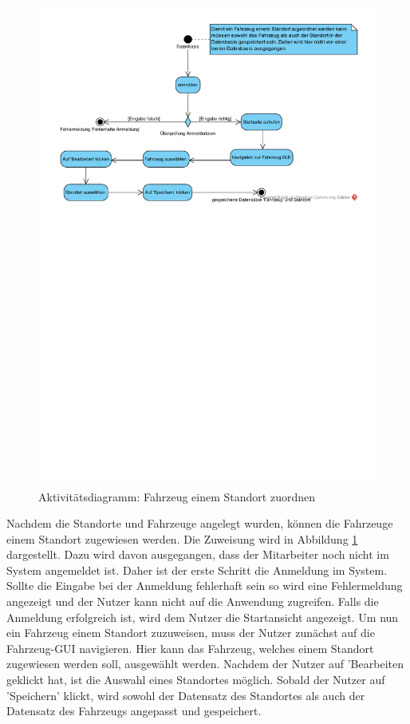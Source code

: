 \begin{figure}[!ht]
    \centering
    \includegraphics[width=\textwidth, trim = 0cm 11cm 0cm 0cm]{Bilder/Diagramme/FahrzeugStandortZuordnen.pdf}
    \caption{Aktivitätsdiagramm: Fahrzeug einem Standort zuordnen}
    \label{img:fahrzeugzuordnen}
\end{figure}

Nachdem die Standorte und Fahrzeuge angelegt wurden, können die Fahrzeuge einem Standort zugewiesen werden. Die Zuweisung wird in Abbildung \ref{img:fahrzeugzuordnen} dargestellt. Dazu wird davon ausgegangen, dass der Mitarbeiter noch nicht im System angemeldet ist. Daher ist der erste Schritt die Anmeldung im System. Sollte die Eingabe bei der Anmeldung fehlerhaft sein so wird eine Fehlermeldung angezeigt und der Nutzer kann nicht auf die Anwendung zugreifen. Falls die Anmeldung erfolgreich ist, wird dem Nutzer die Startansicht angezeigt. Um nun ein Fahrzeug einem Standort zuzuweisen, muss der Nutzer zunächst auf die Fahrzeug-GUI navigieren. Hier kann das Fahrzeug, welches einem Standort zugewiesen werden soll, ausgewählt werden. Nachdem der Nutzer auf 'Bearbeiten geklickt hat, ist die Auswahl eines Standortes möglich. Sobald der Nutzer auf 'Speichern' klickt, wird sowohl der Datensatz des Standortes als auch der Datensatz des Fahrzeugs angepasst und gespeichert.

